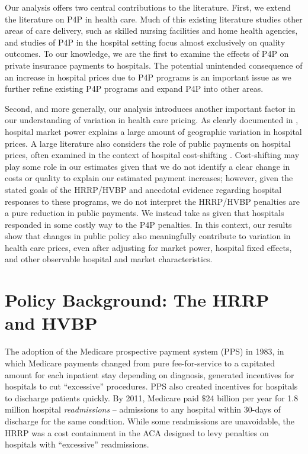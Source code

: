 \documentclass[12pt]{article}
\begin{document}
Our analysis offers two central contributions to the literature. First, we extend the literature on P4P in health care. Much of this existing literature studies other areas of care delivery, such as skilled nursing facilities and home health agencies, and studies of P4P in the hospital setting focus almost exclusively on quality outcomes. To our knowledge, we are the first to examine the effects of P4P on private insurance payments to hospitals. The potential unintended consequence of an increase in hospital prices due to P4P programs is an important issue as we further refine existing P4P programs and expand P4P into other areas.

Second, and more generally, our analysis introduces another important factor in our understanding of variation in health care pricing. As clearly documented in \cite{cooper2017}, hospital market power explains a large amount of geographic variation in hospital prices. A large literature also considers the role of public payments on hospital prices, often examined in the context of hospital cost-shifting \citep{dranove1988,cutler2000,frakt2011}. Cost-shifting may play some role in our estimates given that we do not identify a clear change in costs or quality to explain our estimated payment increases; however, given the stated goals of the HRRP/HVBP and anecdotal evidence regarding hospital responses to these programs, we do not interpret the HRRP/HVBP penalties are a pure reduction in public payments. We instead take as given that hospitals responded in some costly way to the P4P penalties. In this context, our results show that changes in public policy also meaningfully contribute to variation in health care prices, even after adjusting for market power, hospital fixed effects, and other observable hospital and market characteristics.

\section{Policy Background: The HRRP and HVBP}
\label{sec:Background}

The adoption of the Medicare prospective payment system (PPS) in 1983, in which Medicare payments changed from pure fee-for-service to a capitated amount for each inpatient stay depending on diagnosis, generated incentives for hospitals to cut ``excessive'' procedures. PPS also created incentives for hospitals to discharge patients quickly.  By 2011, Medicare paid $\$$24 billion per year for 1.8 million hospital \textit{readmissions} -- admissions to any hospital within 30-days of discharge for the same condition.  While some readmissions are unavoidable, the HRRP was a cost containment in the ACA designed to levy penalties on hospitals with ``excessive'' readmissions.
\end{document}
